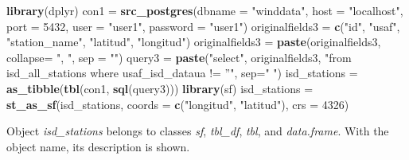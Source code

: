 \documentclass[12pt,oneside]{reedthesis}
\newenvironment{Shaded}{\begin{snugshade}}{\end{snugshade}}
\newcommand{\DataTypeTok}[1]{\textcolor[rgb]{0.13,0.29,0.53}{#1}}
\newcommand{\DecValTok}[1]{\textcolor[rgb]{0.00,0.00,0.81}{#1}}
\newcommand{\KeywordTok}[1]{\textcolor[rgb]{0.13,0.29,0.53}{\textbf{#1}}}
\newcommand{\NormalTok}[1]{#1}
\newcommand{\StringTok}[1]{\textcolor[rgb]{0.31,0.60,0.02}{#1}}
\begin{document}
\vspace{0.4cm}
\begin{Shaded}
\begin{Highlighting}[]
    \KeywordTok{library}\NormalTok{(dplyr)}
\NormalTok{    con1 =}\StringTok{ }\KeywordTok{src_postgres}\NormalTok{(}\DataTypeTok{dbname =} \StringTok{"winddata"}\NormalTok{, }\DataTypeTok{host =} \StringTok{"localhost"}\NormalTok{, }
                        \DataTypeTok{port =} \DecValTok{5432}\NormalTok{, }\DataTypeTok{user =} \StringTok{"user1"}\NormalTok{, }\DataTypeTok{password =} \StringTok{"user1"}\NormalTok{)}
\NormalTok{    originalfields3 =}\StringTok{ }\KeywordTok{c}\NormalTok{(}\StringTok{"id"}\NormalTok{, }\StringTok{"usaf"}\NormalTok{, }\StringTok{"station_name"}\NormalTok{, }\StringTok{"latitud"}\NormalTok{, }\StringTok{"longitud"}\NormalTok{)}
\NormalTok{    originalfields3 =}\StringTok{ }\KeywordTok{paste}\NormalTok{(originalfields3, }\DataTypeTok{collapse=} \StringTok{", "}\NormalTok{, }\DataTypeTok{sep =} \StringTok{""}\NormalTok{)}
\NormalTok{    query3 =}\StringTok{ }\KeywordTok{paste}\NormalTok{(}\StringTok{"select"}\NormalTok{, originalfields3, }
                   \StringTok{"from isd_all_stations where usaf_isd_dataua != ''"}\NormalTok{, }\DataTypeTok{sep=}\StringTok{" "}\NormalTok{)}
\NormalTok{    isd_stations =}\StringTok{ }\KeywordTok{as_tibble}\NormalTok{(}\KeywordTok{tbl}\NormalTok{(con1, }\KeywordTok{sql}\NormalTok{(query3)))}
    \KeywordTok{library}\NormalTok{(sf)}
\NormalTok{    isd_stations =}\StringTok{ }\KeywordTok{st_as_sf}\NormalTok{(isd_stations, }\DataTypeTok{coords =} \KeywordTok{c}\NormalTok{(}\StringTok{"longitud"}\NormalTok{, }\StringTok{"latitud"}\NormalTok{), }\DataTypeTok{crs =} \DecValTok{4326}\NormalTok{)}
\end{Highlighting}
\end{Shaded}
\normalsize

Object \emph{isd\_stations} belongs to classes \emph{sf}, \emph{tbl\_df}, \emph{tbl}, and \emph{data.frame}. With the object name, its description is shown.

\scriptsize
\end{document}
